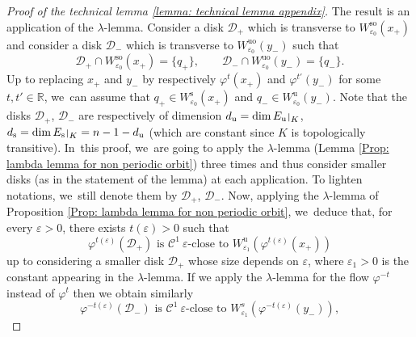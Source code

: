 \documentclass[JEP,XML,SOM,Unicode,NoEqCountersInSection,NoFloatCountersInSection,published]{cedram}
\newcommand{\rs}{\mathrm{s}}
\newcommand{\rso}{\mathrm{so}}
\newcommand{\ru}{\mathrm{u}}
\newcommand{\ruo}{\mathrm{uo}}
\theoremstyle{definition}
\theoremstyle{plain}
\newcommand{\Ccal}{\mathcal{C}}
\newcommand{\D}{\mathcal{D}}
\newcommand{\R}{\mathbb{R}}
\def\rest#1#2{\mathchoice
{\setbox1\hbox{${\displaystyle #1}_{\scriptstyle #2}$}
\restrictionaux{#1}{#2}}
{\setbox1\hbox{${\textstyle #1}_{\scriptstyle #2}$}
\restrictionaux{#1}{#2}}
{\setbox1\hbox{${\scriptstyle #1}_{\scriptscriptstyle #2}$}
\restrictionaux{#1}{#2}}
{\setbox1\hbox{${\scriptscriptstyle #1}_{\scriptscriptstyle #2}$}
\restrictionaux{#1}{#2}}}
\def\restrictionaux#1#2{{#1\,\smash{\vrule height.8\ht1 depth.85\dp1}}_{\,#2}}
\begin{document}
\begin{appendix}
\begin{proof}[Proof of the technical lemma \ref{lemma: technical lemma appendix}]
The result is an application of the $\lambda$-lemma. Consider a disk $\D_{+}$ which is transverse to $W_{\varepsilon_0}^{\rso} (x_+)$ and consider a disk $\D_{-}$ which is transverse to $W_{\varepsilon_0}^{\ruo} (y_-)$ such that
\[
\D_{+} \cap W_{\varepsilon_0}^{\rso} (x_+) = \{q_+ \}, \qquad \D_{-} \cap W_{\varepsilon_0}^{\ruo} (y_-) = \{q_- \}.
\]
Up to replacing $x_+$ and $y_-$ by respectively $\varphi^t (x_+)$ and $\varphi^{t'}(y_-)$ for some $t, t' \in \R$, we~can assume that $q_+ \in W_{\varepsilon_0}^\rs (x_+)$ and $q_- \in W_{\varepsilon_0}^\ru (y_-)$.
Note that the disks $\D_{+}$, $\D_-$ are respectively of dimension $d_{\ru} = \dim \rest{E_{\ru}}{K}$, $d_{\rs} = \dim \rest{E_{\rs}}{K} = n - 1 - d_{\ru}$ (which are constant since $K$ is topologically transitive). In~this proof, we~are going to apply the $\lambda$-lemma (Lemma \ref{Prop: lambda lemma for non periodic orbit}) three times and thus consider smaller disks (as in the statement of the lemma) at each application. To lighten notations, we~still denote them by $\D_{+}$, $\D_-$. Now, applying the $\lambda$-lemma of Proposition \ref{Prop: lambda lemma for non periodic orbit}, we~deduce that, for every $\varepsilon > 0$, there exists $t (\varepsilon) > 0$ such that
\[
\varphi^{t (\varepsilon)} (\D_{+}) \text{ is } \Ccal^1 \: \varepsilon\text{-close to } W_{\varepsilon_1}^{\ru} (\varphi^{ t (\varepsilon)} (x_+))
\]
up to considering a smaller disk $\D_+$ whose size depends on $\varepsilon$, where $\varepsilon_1 > 0$ is the constant appearing in the $\lambda$-lemma.
If we apply the $\lambda$-lemma for the flow $\varphi^{-t}$ instead of $\varphi^t$ then we obtain similarly
\begin{equation}\label{eq: proof technical lemma - reverse lambda lemma}
\varphi^{-t (\varepsilon)} (\D_{-}) \text{ is } \Ccal^1 \: \varepsilon\text{-close to } W_{\varepsilon_1}^{s} (\varphi^{ - t (\varepsilon)} (y_-)),
\end{equation}

\end{proof}
\end{appendix}
\end{document}
